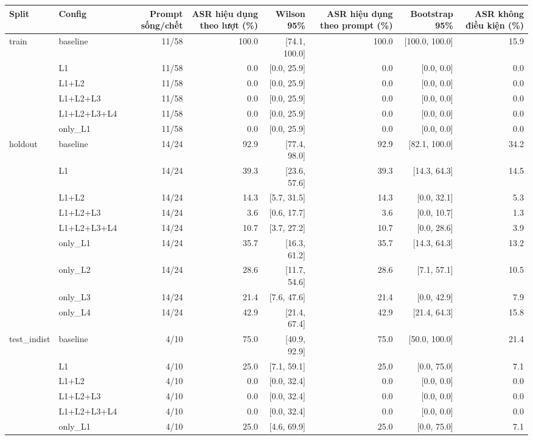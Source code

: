 \begin{tabular}{llrrrrrr}
\toprule
Split & Config & Prompt sống/chết & ASR hiệu dụng theo lượt (\%) & Wilson 95\% & ASR hiệu dụng theo prompt (\%) & Bootstrap 95\% & ASR không điều kiện (\%) \\
\midrule
train & baseline & 11/58 & 100.0 & [74.1, 100.0] & 100.0 & [100.0, 100.0] & 15.9 \\
 & L1 & 11/58 & 0.0 & [0.0, 25.9] & 0.0 & [0.0, 0.0] & 0.0 \\
 & L1+L2 & 11/58 & 0.0 & [0.0, 25.9] & 0.0 & [0.0, 0.0] & 0.0 \\
 & L1+L2+L3 & 11/58 & 0.0 & [0.0, 25.9] & 0.0 & [0.0, 0.0] & 0.0 \\
 & L1+L2+L3+L4 & 11/58 & 0.0 & [0.0, 25.9] & 0.0 & [0.0, 0.0] & 0.0 \\
 & only\_L1 & 11/58 & 0.0 & [0.0, 25.9] & 0.0 & [0.0, 0.0] & 0.0 \\
\midrule
holdout & baseline & 14/24 & 92.9 & [77.4, 98.0] & 92.9 & [82.1, 100.0] & 34.2 \\
 & L1 & 14/24 & 39.3 & [23.6, 57.6] & 39.3 & [14.3, 64.3] & 14.5 \\
 & L1+L2 & 14/24 & 14.3 & [5.7, 31.5] & 14.3 & [0.0, 32.1] & 5.3 \\
 & L1+L2+L3 & 14/24 & 3.6 & [0.6, 17.7] & 3.6 & [0.0, 10.7] & 1.3 \\
 & L1+L2+L3+L4 & 14/24 & 10.7 & [3.7, 27.2] & 10.7 & [0.0, 28.6] & 3.9 \\
 & only\_L1 & 14/24 & 35.7 & [16.3, 61.2] & 35.7 & [14.3, 64.3] & 13.2 \\
 & only\_L2 & 14/24 & 28.6 & [11.7, 54.6] & 28.6 & [7.1, 57.1] & 10.5 \\
 & only\_L3 & 14/24 & 21.4 & [7.6, 47.6] & 21.4 & [0.0, 42.9] & 7.9 \\
 & only\_L4 & 14/24 & 42.9 & [21.4, 67.4] & 42.9 & [21.4, 64.3] & 15.8 \\
\midrule
test\_indist & baseline & 4/10 & 75.0 & [40.9, 92.9] & 75.0 & [50.0, 100.0] & 21.4 \\
 & L1 & 4/10 & 25.0 & [7.1, 59.1] & 25.0 & [0.0, 75.0] & 7.1 \\
 & L1+L2 & 4/10 & 0.0 & [0.0, 32.4] & 0.0 & [0.0, 0.0] & 0.0 \\
 & L1+L2+L3 & 4/10 & 0.0 & [0.0, 32.4] & 0.0 & [0.0, 0.0] & 0.0 \\
 & L1+L2+L3+L4 & 4/10 & 0.0 & [0.0, 32.4] & 0.0 & [0.0, 0.0] & 0.0 \\
 & only\_L1 & 4/10 & 25.0 & [4.6, 69.9] & 25.0 & [0.0, 75.0] & 7.1 \\
\bottomrule
\end{tabular}
